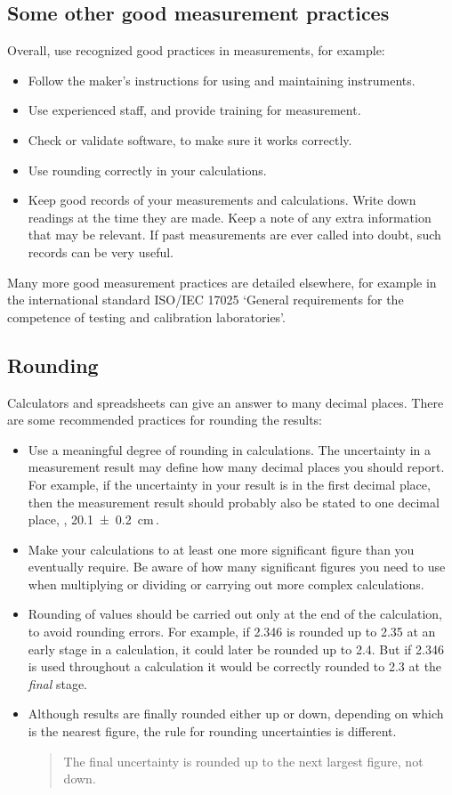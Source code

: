 \subsection{Some other good measurement practices}
Overall, use recognized good practices in measurements, for example:
\begin{itemize}
\item Follow the maker's instructions for using and maintaining instruments.
\item Use experienced staff, and provide training for measurement.
\item Check or validate software, to make sure it works correctly.
\item Use rounding correctly in your calculations.
\item Keep good records of your measurements and calculations. Write down readings at the time they are made. Keep a note of any extra information that may be relevant. If past measurements are ever called into doubt, such records can be very useful.
\end{itemize}
Many more good measurement practices are detailed elsewhere, for example in the international standard ISO/IEC 17025 `General requirements for the competence of testing and calibration laboratories'.


\subsection{Rounding}
Calculators and spreadsheets can give an answer to many decimal places. There are some recommended practices for rounding the results:
\begin{itemize}
\item Use a meaningful degree of rounding in calculations. The uncertainty in a measurement result may define how many decimal places you should report. For example, if the uncertainty in your result is in the first decimal place, then the measurement result should probably also be stated to one decimal place, \eg, 
\beq
\SI{20.1+-0.2}{cm}\,.
\eeq
%
\item Make your calculations to at least one more significant figure than you eventually require. Be aware of how many significant figures you need to use when multiplying or dividing or carrying out more complex calculations.
%
\item Rounding of values should be carried out only at the end of the calculation, to avoid rounding errors. For example, if 2.346 is rounded up to 2.35 at an early stage in a calculation, it could later be rounded up to 2.4. But if 2.346 is used throughout a calculation it would be correctly rounded to 2.3 at the \emph{final} stage.
%
\item Although results are finally rounded either up or down, depending on which is the nearest figure, the rule for rounding uncertainties is different. 
\begin{quote}
The final uncertainty is rounded up to the next largest figure, not down.
\end{quote}
\end{itemize}


